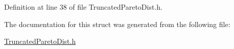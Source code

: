 Definition at line 38 of file Truncated\+Pareto\+Dist.\+h.



The documentation for this struct was generated from the following file\+:\begin{DoxyCompactItemize}
\item 
\hyperlink{TruncatedParetoDist_8h}{Truncated\+Pareto\+Dist.\+h}\end{DoxyCompactItemize}
